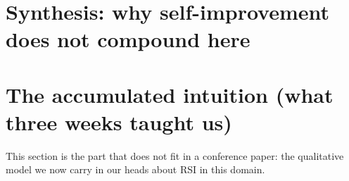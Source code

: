 \section{Synthesis: why self-improvement does not compound here}
{\let\section\subsection }

\section{The accumulated intuition (what three weeks taught us)}
This section is the part that does not fit in a conference paper: the qualitative model we now carry in our
heads about RSI in this domain.

